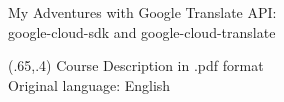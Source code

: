 \documentclass{beamer}
\begin{document}
\begin{frame}{My Adventures with Google Translate API:\\
google-cloud-sdk and google-cloud-translate}


\begin{textblock}{1}(.65,.4)
  \footnotesize  {Course Description in .pdf format \\
Original language: English}
\end{textblock}

\end{frame}
\end{document}
